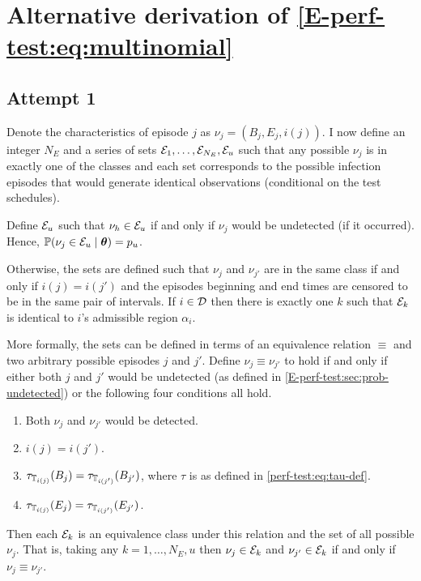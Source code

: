 \documentclass[thesis.tex]{subfiles}
\begin{document}
\chapter{Alternative derivation of \cref{E-perf-test:eq:multinomial}} \label{perf-test:sec:alt-likelihood}

\section{Attempt 1}

Denote the characteristics of episode $j$ as $\nu_j = (B_j, E_j, i(j))$.
I now define an integer $N_E$ and a series of sets $\mathcal{E}_1, \dots, \mathcal{E}_{N_E}, \mathcal{E}_u$ such that any possible $\nu_j$ is in exactly one of the classes and each set corresponds to the possible infection episodes that would generate identical observations (conditional on the test schedules).

Define $\mathcal{E}_u$ such that $\nu_h \in \mathcal{E}_u$ if and only if $\nu_j$ would be undetected (if it occurred).
Hence, $\operatorname{\mathbb{P}}(\nu_j \in \mathcal{E}_u \mid \bm{\theta}) = p_u$.

Otherwise, the sets are defined such that $\nu_j$ and $\nu_{j'}$ are in the same class if and only if $i(j) = i(j')$ and the episodes beginning and end times are censored to be in the same pair of intervals.
If $i \in \mathcal{D}$ then there is exactly one $k$ such that $\mathcal{E}_k$ is identical to $i$'s admissible region $\alpha_i$.

More formally, the sets can be defined in terms of an equivalence relation $\equiv$ and two arbitrary possible episodes $j$ and $j'$.
Define $\nu_j \equiv \nu_{j'}$ to hold if and only if either both $j$ and $j'$ would be undetected (as defined in \cref{E-perf-test:sec:prob-undetected}) or the following four conditions all hold.
\begin{enumerate}
    \item Both $\nu_j$ and $\nu_{j'}$ would be detected.
    \item $i(j) = i(j')$.
    \item $\tau_{\mathbb{T}_{i(j)}}(B_j) = \tau_{\mathbb{T}_{i(j')}}(B_{j'})$, where $\tau$ is as defined in \cref{perf-test:eq:tau-def}.
    \item $\tau_{\mathbb{T}_{i(j)}}(E_j) = \tau_{\mathbb{T}_{i(j')}}(E_{j'})$.
\end{enumerate}
Then each $\mathcal{E}_k$ is an equivalence class under this relation and the set of all possible $\nu_j$.
That is, taking any $k = 1, \dots, N_E, u$ then $\nu_j \in \mathcal{E}_k$ and $\nu_{j'} \in \mathcal{E}_k$ if and only if $\nu_j \equiv \nu_{j'}$.
\end{document}
